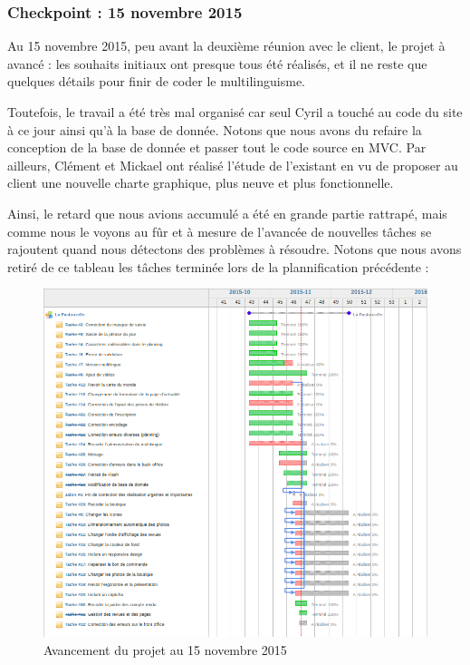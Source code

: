 \documentclass[11pt]{report}
\begin{document}
\subsubsection*{Checkpoint : 15 novembre 2015}
\par Au 15 novembre 2015, peu avant la deuxième réunion avec le client, le
projet à avancé : les souhaits initiaux ont presque tous été réalisés, et il ne reste que
quelques détails pour finir de coder le multilinguisme. \\
\par Toutefois, le travail a été très mal organisé car seul Cyril a touché au
code du site à ce jour ainsi qu'à la base de donnée. Notons que nous avons du
refaire la conception de la base de donnée et passer tout le code source en MVC. Par
ailleurs, Clément et Mickael ont réalisé l'étude de l'existant en vu de proposer
au client une nouvelle charte graphique, plus neuve et plus fonctionnelle. \\
\par Ainsi, le retard que nous avions accumulé a été en grande partie rattrapé,
mais comme nous le voyons au fûr et à mesure de l'avancée de nouvelles tâches se
rajoutent quand nous détectons des problèmes à résoudre. Notons que nous avons
retiré de ce tableau les tâches terminée lors de la plannification précédente :

\begin{landscape}
\begin{figure}[t]
    \caption{Avancement du projet au 15 novembre 2015}
   \includegraphics[scale=0.5]{include/gantt15-11.png}
\end{figure}
\end{landscape}
\end{document}
